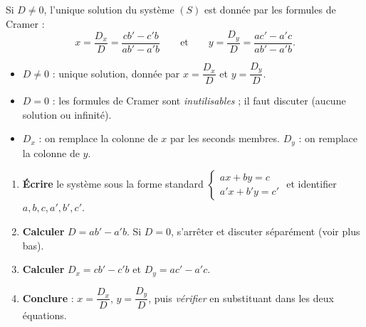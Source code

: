 \documentclass[11pt]{article}
\newcommand{\cle}[1]{{\popxbold\color{popdark}#1}}
\begin{document}
\begin{propriete}
Si $D\neq 0$, l'unique solution du système $(S)$ est donnée par les \cle{formules de Cramer} :
\[
x = \frac{D_x}{D} = \frac{cb'-c'b}{ab'-a'b}
\qquad\text{et}\qquad
y = \frac{D_y}{D} = \frac{ac'-a'c}{ab'-a'b}.
\]
\end{propriete}

\begin{aretenir}
\begin{itemize}
\item $D\neq 0$ : unique solution, donnée par $x=\dfrac{D_x}{D}$ et $y=\dfrac{D_y}{D}$.
\item $D=0$ : les formules de Cramer sont \emph{inutilisables} ; il faut discuter (aucune solution ou infinité).
\item $D_x$ : on remplace la colonne de $x$ par les seconds membres. $D_y$ : on remplace la colonne de $y$.
\end{itemize}
\end{aretenir}

\begin{methode}
\begin{enumerate}
\item \textbf{Écrire} le système sous la forme standard $\begin{cases} ax+by=c \\ a'x+b'y=c' \end{cases}$ et identifier $a,b,c,a',b',c'$.
\item \textbf{Calculer} $D=ab'-a'b$. Si $D=0$, s'arrêter et discuter séparément (voir plus bas).
\item \textbf{Calculer} $D_x=cb'-c'b$ et $D_y=ac'-a'c$.
\item \textbf{Conclure} : $x=\dfrac{D_x}{D}$, $y=\dfrac{D_y}{D}$, puis \emph{vérifier} en substituant dans les deux équations.
\end{enumerate}
\end{methode}
\end{document}
